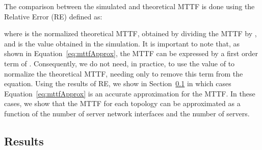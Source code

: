 The comparison between the simulated and theoretical MTTF is done using the Relative Error (RE) defined as:

where  is the normalized theoretical MTTF, obtained by dividing the MTTF by , and  is the value obtained in the simulation. It is important to note that, as shown in Equation~\ref{eq:mttfApprox}, the MTTF can be expressed by a first order term of . Consequently, we do not need, in practice, to use the value of  to normalize the theoretical MTTF, needing only to remove this term from the equation.
Using the results of RE, we show in Section~\ref{sec:reliableTimeResults} in which cases Equation~\ref{eq:mttfApprox} is an accurate approximation for the MTTF. In these cases, we show that the MTTF for each topology can be approximated as a function of the number of server network interfaces and the number of servers. 
\subsection{Results}
\label{sec:reliableTimeResults} 

